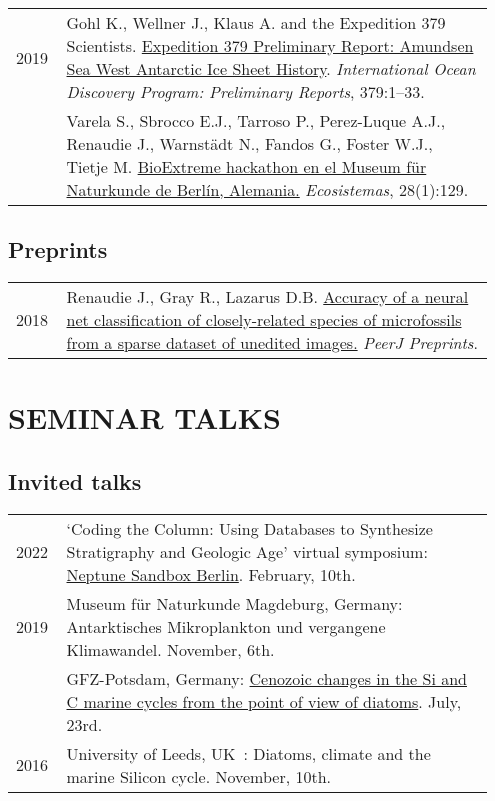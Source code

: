 \documentclass[11pt, a4paper]{article}
\makeatletter
\newcommand\fnoteref[1]{\protected@xdef\@theenmark{\ref{#1}}\@endnotemark}
\makeatother
\begin{document}
\begin{longtable}{@{}p{0.1\linewidth} P{0.85\linewidth}@{}}
2019 & Gohl K., Wellner J., Klaus A. and the Expedition 379 Scientists\fnoteref{exp379scientists}. \href{http://publications.iodp.org/preliminary_report/379/index.html}{Expedition 379 Preliminary Report: Amundsen Sea West Antarctic Ice Sheet History}. \textit{International Ocean Discovery Program: Preliminary Reports}, 379:1--33.\\
    & Varela S., Sbrocco E.J., Tarroso P., Perez-Luque A.J., Renaudie J., Warnst\"{a}dt N., Fandos G., Foster W.J., Tietje M. \href{http://dx.doi.org/10.7818/ECOS.1707}{BioExtreme hackathon en el Museum f\"{u}r Naturkunde de Berlín, Alemania.} \textit{Ecosistemas}, 28(1):129.\\
\end{longtable}

\subsection{Preprints}
\begin{longtable}{@{}p{0.1\linewidth} P{0.85\linewidth}@{}}
2018 & Renaudie J., Gray R., Lazarus D.B. \href{https://peerj.com/preprints/27328/}{Accuracy of a neural net classification of closely-related species of microfossils from a sparse dataset of unedited images.} \textit{PeerJ Preprints}.\\
\end{longtable}

\section{SEMINAR TALKS}
\subsection{Invited talks}
\begin{longtable}{@{}p{0.1\linewidth} P{0.85\linewidth}@{}}
2022 & `Coding the Column: Using Databases to Synthesize Stratigraphy and Geologic Age' virtual symposium: \href{https://plannapus.github.io/data/20220210CodingTheColumn.pdf}{Neptune Sandbox Berlin}. February, 10th.\\
2019 & Museum f\"{u}r Naturkunde Magdeburg, Germany: Antarktisches Mikroplankton und vergangene Klimawandel. November, 6th.\\
    & GFZ-Potsdam, Germany: \href{http://plannapus.github.io/data/20190723Potsdam.pdf}{Cenozoic changes in the Si and C marine cycles from the point of view of diatoms}. July, 23rd.\\
2016 & University of Leeds, UK : Diatoms, climate and the marine Silicon cycle. November, 10th.\\
\end{longtable}
\end{document}
